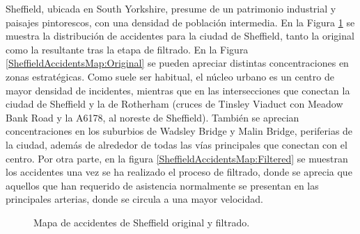 Sheffield, ubicada en South Yorkshire, presume de un patrimonio industrial y paisajes pintorescos, con una densidad de población intermedia. En la Figura \ref{SheffieldAccidentsMap} se muestra la distribución de accidentes para la ciudad de Sheffield, tanto la original como la resultante tras la etapa de filtrado. En la Figura \ref{SheffieldAccidentsMap:Original} se pueden apreciar distintas concentraciones en zonas estratégicas. Como suele ser habitual, el núcleo urbano es un centro de mayor densidad de incidentes, mientras que en las intersecciones que conectan la ciudad de Sheffield y la de Rotherham (cruces de Tinsley Viaduct con Meadow Bank Road y la A6178, al noreste de Sheffield). También se aprecian concentraciones en los suburbios de Wadsley Bridge y Malin Bridge, periferias de la ciudad, además de alrededor de todas las vías principales que conectan con el centro. Por otra parte, en la figura \ref{SheffieldAccidentsMap:Filtered} se muestran los accidentes una vez se ha realizado el proceso de filtrado, donde se aprecia que aquellos que han requerido de asistencia normalmente se presentan en las principales arterias, donde se circula a una mayor velocidad.


\begin{figure}[H]
	\centering
	\caption{Mapa de accidentes de Sheffield original y filtrado.}
	\label{SheffieldAccidentsMap}
\end{figure}


